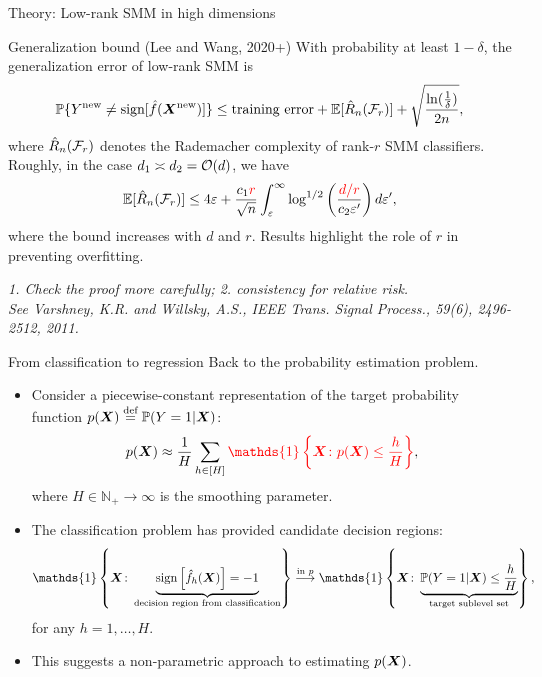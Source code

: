 \documentclass[compress,dvipsnames]{beamer}
\let\olditem\item
\renewcommand\item{\olditem\justifying}
\begin{document}
\begin{frame}{Theory: Low-rank SMM in high dimensions}

\begin{block}{Generalization bound (Lee and Wang, 2020+)}
With probability at least $1-\delta$, the generalization error of low-rank SMM is
\[
\mathbb{P}\{Y^{\text{new}}\neq \text{sign}[\hat f(\bm{X}^{\text{new}})]\} \leq \text{training error} +\mathbb{E}[\hat R_n({\mathcal F}_r)]+\sqrt{\ln({1\over \delta})\over 2n},
\]
where $\hat R_{n}({\mathcal F}_r)$ denotes the Rademacher complexity of rank-$r$ SMM classifiers. Roughly, in the case $d_1\asymp d_2={\mathcal O}(d)$, we have
\[
\mathbb{E}[\hat R_{n}({\mathcal F}_r)] \leq 4\varepsilon+{c_1{\color{red}r} \over \sqrt{n}} \int_{\varepsilon}^{\infty}\log^{1/2} \left({{\color{red} d/r}\over c_2\varepsilon'} \right)d\varepsilon',
\]
where the bound increases with {\color{red}$d$ and $r$}. Results highlight the role of $r$ in preventing overfitting. 
\end{block}



{\scriptsize \it 1. Check the proof more carefully; 2. consistency for relative risk. \\

See Varshney, K.R. and Willsky, A.S., IEEE Trans. Signal Process., 59(6), 2496-2512, 2011.}

\end{frame}


\begin{frame}{From classification to regression}
Back to the probability estimation problem. 
\begin{itemize}
\item Consider a piecewise-constant representation of the target probability function $p(\bm{X})\stackrel{\text{def}}{=}\mathbb{P}(Y=1|\bm{X})$:
\[
p(\mX) \approx {1\over H}\sum_{h\in[H]}{\color{red} \mathds{1}\left\{\mX\colon p(\mX)\leq {h\over H}\right\} },
\]
where $H\in\mathbb{N}_{+} \to \infty$ is the smoothing parameter. 
\item The classification problem has provided candidate decision regions:
\[
 \mathds{1}\left\{\mX\colon \KeepStyleUnderBrace{\text{sign}\left[\hat{f}_{h}(\mX)\right]=-1}_{\text{decision region from classification}}\right\} \stackrel{\text{in $p$}}{\longrightarrow} \mathds{1}\left\{ \mX\colon \KeepStyleUnderBrace{\mathbb{P}(Y=1|\mX)\leq {h\over H}}_{\text{target sublevel set}} \right\},
\]
for any $h=1,\ldots,H$.
\item This suggests a non-parametric approach to estimating $p(\bm{X})$.
\end{itemize}
\end{frame}
\end{document}
